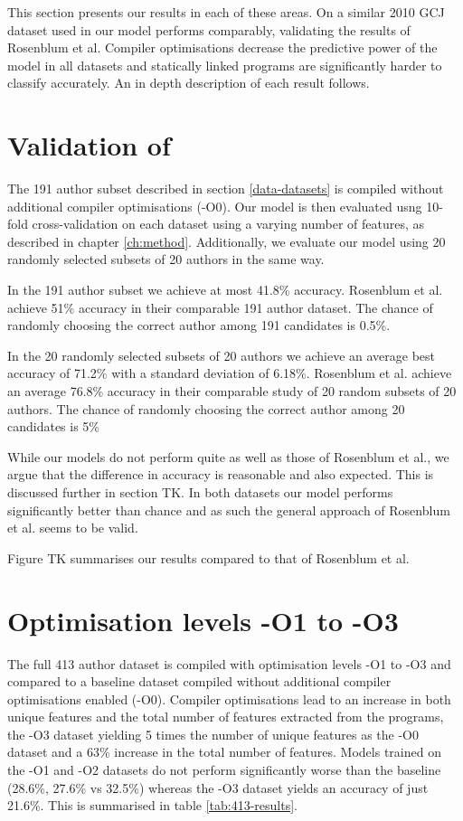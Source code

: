 \documentclass[a4paper,11pt]{kth-mag}
\begin{document}
This section presents our results in each of these areas. On a similar 2010 GCJ
dataset used in \parencite{rosenblum2011wrote} our model performs comparably,
validating the results of Rosenblum et al. Compiler optimisations decrease the
predictive power of the model in all datasets and statically linked programs
are significantly harder to classify accurately. An in depth description of
each result follows.

\section{Validation of \parencite{rosenblum2011wrote}}
The 191 author subset described in section \ref{data-datasets} is
compiled without additional compiler optimisations (-O0). Our model is then
evaluated usng 10-fold cross-validation on each dataset using a varying number
of features, as described in chapter \ref{ch:method}. Additionally, we evaluate
our model using 20 randomly selected subsets of 20 authors in the same way.

In the 191 author subset we achieve at most 41.8\% accuracy. Rosenblum et al.
achieve 51\% accuracy in their comparable 191 author dataset. The chance of
randomly choosing the correct author among 191 candidates is 0.5\%.

In the 20 randomly selected subsets of 20 authors we achieve an average best
accuracy of 71.2\% with a standard deviation of 6.18\%. Rosenblum et al.
achieve an average 76.8\% accuracy in their comparable study of 20 random
subsets of 20 authors. The chance of randomly choosing the correct author
among 20 candidates is 5\%

While our models do not perform quite as well as those of Rosenblum et al.,  we
argue that the difference in accuracy is reasonable and also expected. This is
discussed further in section TK. In both datasets our model performs
significantly better than chance and as such the general approach of Rosenblum
et al. seems to be valid.

Figure TK summarises our results compared to that of Rosenblum et al.

\section{Optimisation levels -O1 to -O3}
The full 413 author dataset is compiled with optimisation levels -O1 to -O3 and
compared to a baseline dataset compiled without additional compiler
optimisations enabled (-O0). Compiler optimisations lead to an increase in both
unique features and the total number of features extracted from the programs,
the -O3 dataset yielding 5 times the number of unique features as the -O0
dataset and a 63\% increase in the total number of features. Models trained on
the -O1 and -O2 datasets do not perform significantly worse than the baseline
(28.6\%, 27.6\%  vs 32.5\%) whereas the -O3 dataset yields an accuracy of just 21.6\%.
This is summarised in table \ref{tab:413-results}.
\end{document}
